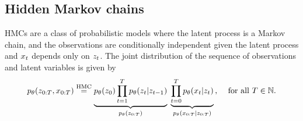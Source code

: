 \subsection{Hidden Markov chains}
\label{sec:hmc}


HMCs are a class of probabilistic models
where the latent process is a Markov chain, 
and  the observations are conditionally independent
given the latent process and $x_t$ depends only on $z_t$.
The joint distribution of the sequence of observations and latent variables
is given by
\begin{equation}
    \label{eq:hmc_intro}
    p_{\theta}(z_{0:T}, x_{0:T} ) \overset{\text{HMC}}{=} 
    \underbrace{p_{\theta}(z_0)\prod_{t=1}^{T}  p_{\theta}(z_{t}|z_{t-1})}_{p_{\theta}(z_{0:T})}
    \;  \underbrace{\prod_{t=0}^{T}  p_{\theta}(x_{t}|z_{t})}_{p_{\theta}(x_{0:T}|z_{0:T})} 
    \text{,} \quad \text{ for all } T \in \mathbb{N}  \text{.}
\end{equation}


